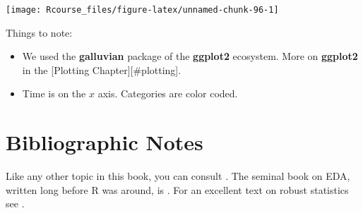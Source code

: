 \documentclass[]{book}
\newenvironment{Shaded}{\begin{snugshade}}{\end{snugshade}}
\newcommand{\KeywordTok}[1]{\textcolor[rgb]{0.13,0.29,0.53}{\textbf{#1}}}
\newcommand{\DataTypeTok}[1]{\textcolor[rgb]{0.13,0.29,0.53}{#1}}
\newcommand{\StringTok}[1]{\textcolor[rgb]{0.31,0.60,0.02}{#1}}
\newcommand{\OperatorTok}[1]{\textcolor[rgb]{0.81,0.36,0.00}{\textbf{#1}}}
\newcommand{\NormalTok}[1]{#1}
\providecommand{\tightlist}{%
  \setlength{\itemsep}{0pt}\setlength{\parskip}{0pt}}
\theoremstyle{definition}
\theoremstyle{definition}
\theoremstyle{definition}
\theoremstyle{remark}
\begin{document}
\begin{Shaded}
\end{Shaded}

\texttt{[image: Rcourse\_files/figure-latex/unnamed-chunk-96-1]}

Things to note:

\begin{itemize}
\tightlist
\item
  We used the \textbf{galluvian} package of the \textbf{ggplot2}
  ecosystem. More on \textbf{ggplot2} in the {[}Plotting
  Chapter{]}{[}\#plotting{]}.
\item
  Time is on the \(x\) axis. Categories are color coded.
\end{itemize}

\section{Bibliographic Notes}\label{bibliographic-notes-2}

Like any other topic in this book, you can consult
\citet{venables2013modern}. The seminal book on EDA, written long before
R was around, is \citet{tukey1977exploratory}. For an excellent text on
robust statistics see \citet{wilcox2011introduction}.
\end{document}
